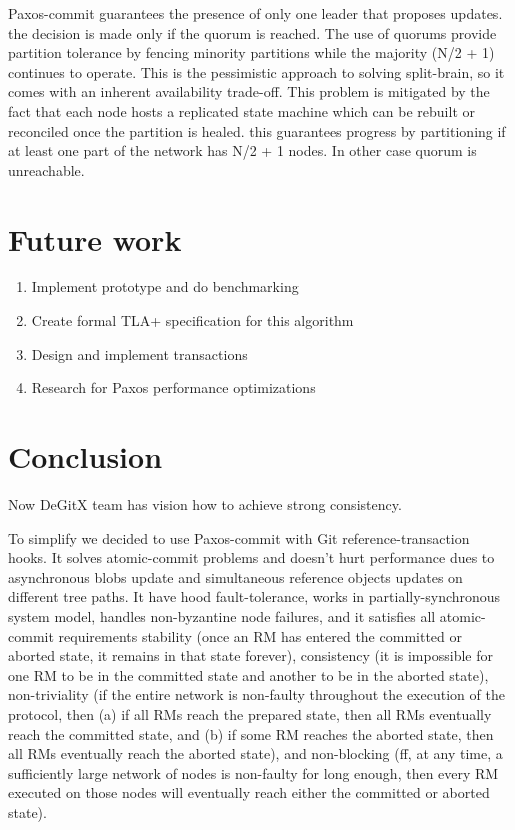 \documentclass[sigplan, screen, nonacm, 11pt]{acmart}
\begin{document}
Paxos-commit guarantees the presence of only one leader that proposes updates.
the decision is made only if the quorum is reached.
The use of quorums provide partition tolerance by fencing minority partitions while the majority (N/2 + 1) continues to operate.
This is the pessimistic approach to solving split-brain,
so it comes with an inherent availability trade-off.
This problem is mitigated by the fact that each node hosts a replicated state machine which can be rebuilt or reconciled once the partition is healed.
this guarantees progress by partitioning if at least one part of the network has N/2 + 1 nodes. In other case quorum is unreachable.

\section{Future work}

\begin{enumerate}
  \item Implement prototype and do benchmarking
  \item Create formal TLA+ specification for this algorithm
  \item Design and implement transactions
  \item Research for Paxos performance optimizations
\end{enumerate}

\section{Conclusion}

Now DeGitX team has vision how to achieve strong consistency.

To simplify we decided to use Paxos-commit with Git reference-transaction hooks.
It solves atomic-commit problems and doesn't hurt performance dues to asynchronous blobs update
and simultaneous reference objects updates on different tree paths.
It have hood fault-tolerance, works in partially-synchronous system model,
handles non-byzantine node failures, and it satisfies all atomic-commit requirements
stability (once an RM has entered the committed or aborted state, it remains in that state forever),
consistency (it is impossible for one RM to be in the committed state and another to be in
the aborted state),
non-triviality (if the entire network is non-faulty throughout the execution of the protocol,
then (a) if all RMs reach the prepared state, then all RMs eventually reach the committed state,
and (b) if some RM reaches the aborted state,  then all RMs eventually reach the aborted state),
and non-blocking (ff, at any time, a sufficiently large network of nodes is non-faulty for long enough,
then every RM executed on those nodes will eventually reach either the committed or aborted state).

\newpage



\end{document}

